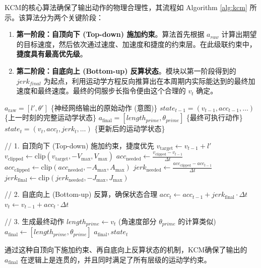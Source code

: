 \documentclass[preprint,12pt]{elsarticle}
\begin{document}
KCM的核心算法确保了输出动作的物理合理性，其流程如 Algorithm \ref{alg:kcm} 所示。该算法分为两个关键阶段：
\begin{enumerate}
    \item \textbf{第一阶段：自顶向下 (Top-down) 施加约束}。算法首先根据 $a_{raw}$ 计算出期望的目标速度，然后依次通过速度、加速度和捷度的约束层。在此级联约束中，\textbf{捷度具有最高优先级}。
    \item \textbf{第二阶段：自底向上 (Bottom-up) 反算状态}。模块以第一阶段得到的 $jerk_{final}$ 为起点，利用运动学方程反向推算出在本周期内实际能达到的最终加速度和最终速度。最终的伺服步长指令便由这个合理的 $v_t$ 确定。
\end{enumerate}

\begin{algorithm}
\caption{运动学约束模块 (KCM)}
\label{alg:kcm}
\begin{algorithmic}[1]
\Require $a_{\text{raw}} = [l', \theta']$ \{神经网络输出的原始动作 (意图)\}
\Require $state_{t-1} = (v_{t-1}, acc_{t-1}, \dots)$ \{上一时刻的完整运动学状态\}
\Ensure $a_{\text{final}} = [length_{prime}, \theta_{prime}]$ \{最终可执行动作\}
\Ensure $state_t = (v_t, acc_t, jerk_t, \dots)$ \{更新后的运动学状态\}

\State // 1. 自顶向下 (Top-down) 施加约束，捷度优先
\State $v_{\text{target}} \leftarrow v_{t-1} + l'$
\State $v_{\text{clipped}} \leftarrow \text{clip}(v_{\text{target}}, -V_{\max}, V_{\max})$
\State $acc_{\text{needed}} \leftarrow \frac{v_{\text{clipped}} - v_{t-1}}{\Delta t}$
\State $acc_{\text{clipped}} \leftarrow \text{clip}(acc_{\text{needed}}, -A_{\max}, A_{\max})$
\State $jerk_{\text{needed}} \leftarrow \frac{acc_{\text{clipped}} - acc_{t-1}}{\Delta t}$
\State $jerk_{\text{final}} \leftarrow \text{clip}(jerk_{\text{needed}}, -J_{\max}, J_{\max})$

\State // 2. 自底向上 (Bottom-up) 反算，确保状态合理
\State $acc_t \leftarrow acc_{t-1} + jerk_{\text{final}} \cdot \Delta t$
\State $v_t \leftarrow v_{t-1} + acc_t \cdot \Delta t$

\State // 3. 生成最终动作
\State $length_{prime} \leftarrow v_t$
\State (角速度部分 $\theta_{prime}$ 的计算类似)
\State $a_{\text{final}} \leftarrow [length_{prime}, \theta_{prime}]$
\State \Return $a_{\text{final}}, state_t$
\end{algorithmic}
\end{algorithm}

通过这种自顶向下施加约束、再自底向上反算状态的机制，KCM确保了输出的 $a_{\text{final}}$ 在逻辑上是连贯的，并且同时满足了所有层级的运动学约束。
\end{document}
